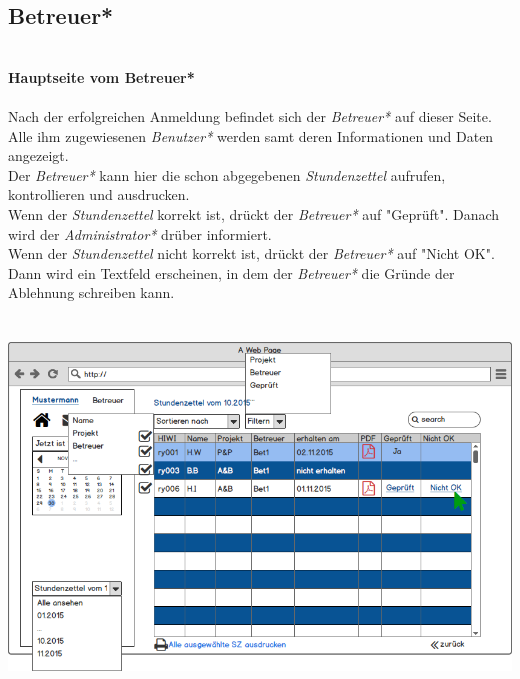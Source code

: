 \subsection{Betreuer*}
\textbf{\\Hauptseite vom Betreuer*}\\
\\
Nach der erfolgreichen Anmeldung befindet sich der \emph{Betreuer*} auf dieser Seite.\\
Alle ihm zugewiesenen \emph{Benutzer*} werden samt deren Informationen und Daten angezeigt.\\
Der \emph{Betreuer*} kann hier die schon abgegebenen \emph{Stundenzettel} aufrufen, kontrollieren und ausdrucken.\\
Wenn der \emph{Stundenzettel} korrekt ist, drückt der \emph{Betreuer*} auf "Geprüft". Danach wird der \emph{Administrator*} drüber informiert.\\
Wenn der \emph{Stundenzettel} nicht korrekt ist, drückt der \emph{Betreuer*} auf "Nicht OK". Dann wird ein Textfeld erscheinen, in dem der \emph{Betreuer*} die Gründe der Ablehnung schreiben kann.\\
\\
\\
\includegraphics[width=\linewidth]{UI/Betreuer/Hauptseite.png}

